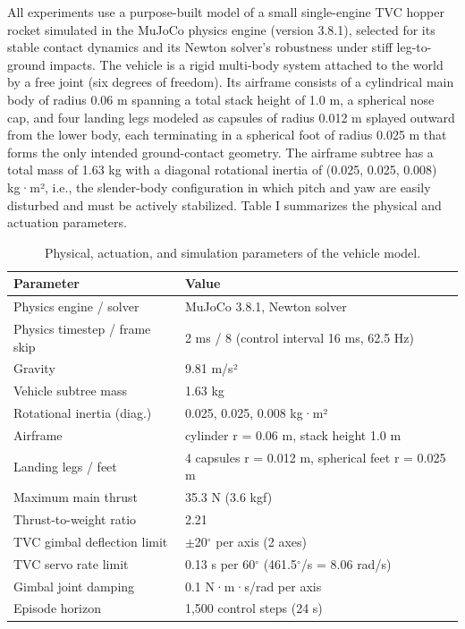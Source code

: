 \documentclass[11pt,a4paper]{article}
\begin{document}
All experiments use a purpose-built model of a small single-engine TVC hopper rocket simulated in the MuJoCo physics engine (version 3.8.1), selected for its stable contact dynamics and its Newton solver's robustness under stiff leg-to-ground impacts. The vehicle is a rigid multi-body system attached to the world by a free joint (six degrees of freedom). Its airframe consists of a cylindrical main body of radius 0.06 m spanning a total stack height of 1.0 m, a spherical nose cap, and four landing legs modeled as capsules of radius 0.012 m splayed outward from the lower body, each terminating in a spherical foot of radius 0.025 m that forms the only intended ground-contact geometry. The airframe subtree has a total mass of 1.63 kg with a diagonal rotational inertia of (0.025, 0.025, 0.008) kg·m², i.e., the slender-body configuration in which pitch and yaw are easily disturbed and must be actively stabilized. Table I summarizes the physical and actuation parameters.


\begin{table}[!ht]
\centering
\caption{Physical, actuation, and simulation parameters of the vehicle model.}
\label{tab:vehicle_params}
\vspace{1ex}
\begin{tabular}{ll}
\toprule
\textbf{Parameter} & \textbf{Value} \\
\midrule
Physics engine / solver & MuJoCo 3.8.1, Newton solver \\
Physics timestep / frame skip & 2 ms / 8 (control interval 16 ms, 62.5 Hz) \\
Gravity & 9.81 m/s² \\
Vehicle subtree mass & 1.63 kg \\
Rotational inertia (diag.) & 0.025, 0.025, 0.008 kg·m² \\
Airframe & cylinder r = 0.06 m, stack height 1.0 m \\
Landing legs / feet & 4 capsules r = 0.012 m, spherical feet r = 0.025 m \\
Maximum main thrust & 35.3 N (3.6 kgf) \\
Thrust-to-weight ratio & 2.21 \\
TVC gimbal deflection limit & $\pm$20$^{\circ}$ per axis (2 axes) \\
TVC servo rate limit & 0.13 s per 60$^{\circ}$ (461.5$^{\circ}$/s = 8.06 rad/s) \\
Gimbal joint damping & 0.1 N·m·s/rad per axis \\
Episode horizon & 1,500 control steps (24 s) \\
\bottomrule
\end{tabular}
\end{table}
\end{document}
